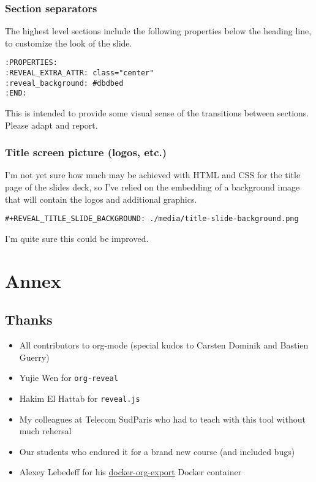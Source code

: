 \documentclass[a4paper]{article}
\begin{document}
\subsubsection{Section separators}
\label{sec:org1e021b8}

The highest level sections include the following properties below the heading line, to customize the look of the slide. 

\begin{verbatim}
:PROPERTIES:
:REVEAL_EXTRA_ATTR: class="center"
:reveal_background: #dbdbed
:END:
\end{verbatim}

This is intended to provide some visual sense of the transitions between sections. Please adapt and report.

\subsubsection{Title screen picture (logos, etc.)}
\label{sec:org04427db}

I'm not yet sure how much may be achieved with HTML and CSS for the
title page of the slides deck, so I've relied on the embedding of a
background image that will contain the logos and additional graphics. 

\begin{verbatim}
#+REVEAL_TITLE_SLIDE_BACKGROUND: ./media/title-slide-background.png
\end{verbatim}

I'm quite sure this could be improved.


\section{Annex}
\label{sec:orgfa523f2}

\subsection{Thanks}
\label{sec:orga3e5f9a}

\begin{itemize}
\item All contributors to org-mode (special kudos to Carsten Dominik and Bastien Guerry)
\item Yujie Wen for \texttt{org-reveal}
\item Hakim El Hattab for \texttt{reveal.js}
\item My colleagues at Telecom SudParis who had to teach with this tool without much rehersal
\item Our students who endured it for a brand new course (and included bugs)
\item Alexey Lebedeff for his
\href{https://github.com/binarin/docker-org-export}{docker-org-export}
Docker container
\end{itemize}
\end{document}
